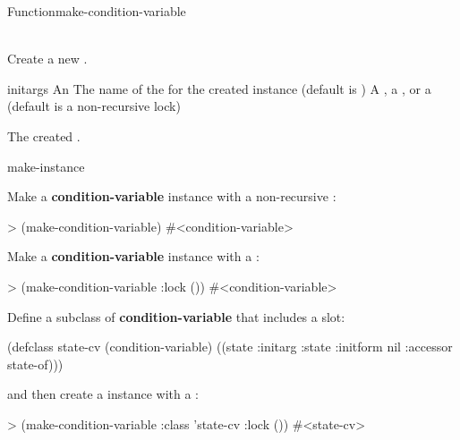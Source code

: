 \begin{functiondoc}{Function}{make-condition-variable}%
  {  \\ 
     \\
   \returns{} }
%
%
%
 
\fnsyntax

\fnpurpose Create a new .

\fnpackage {}

\fnmodule {}

\fnargs
\begin{args}{initargs}
\arg[initargs] An 
\arg[class] The name of the  for the created
 instance (default is )
\arg[lock] A , a , or a 
 (default is a non-recursive lock)
\end{args}

\fnreturns
The created \textbf{}.

\begin{alsos}{make-instance}
\end{alsos}

\fnexamples
Make a \textbf{condition-variable} instance with a non-recursive 
:
\begin{example}
> (make-condition-variable)
#<condition-variable>
\end{example}

Make a \textbf{condition-variable} instance with a
:
\begin{example}
> (make-condition-variable :lock ())
#<condition-variable>
\end{example}

Define a subclass of \textbf{condition-variable} that includes a 
 slot:
\begin{example}
  (defclass state-cv (condition-variable)
    ((state :initarg :state
            :initform nil
            :accessor state-of)))
\end{example}
and then create a  instance with a :
\begin{example}
> (make-condition-variable :class 'state-cv
                           :lock ())
#<state-cv>
\end{example}

\end{functiondoc}

